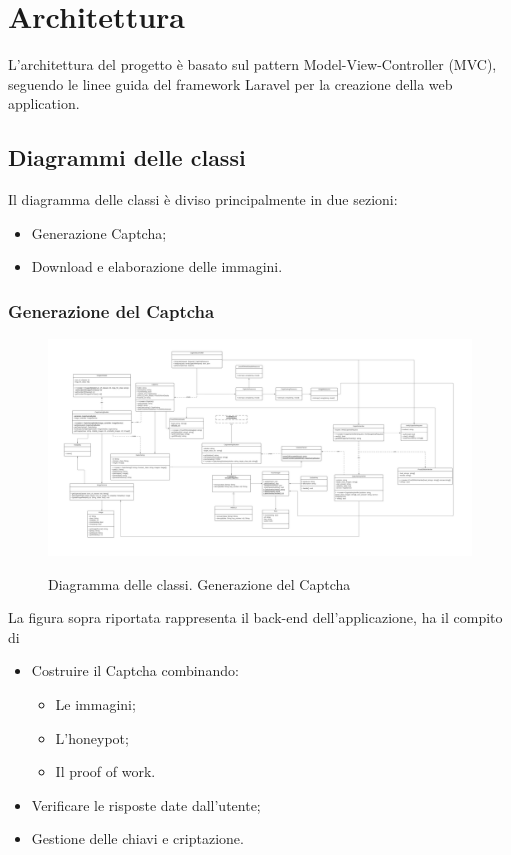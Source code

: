 \section{Architettura}
L'architettura del progetto è basato sul pattern Model-View-Controller (MVC), seguendo le linee guida del framework Laravel per la creazione della web application.


\subsection{Diagrammi delle classi}

Il diagramma delle classi è diviso principalmente in due sezioni:
\begin{itemize}
    \item Generazione Captcha;
    \item Download e elaborazione delle immagini.
\end{itemize}

\subsubsection{Generazione del Captcha}

\begin{landscape}
\begin{figure}[H]
    \centering
    \includegraphics[scale = 0.6]{img/generale.png}\\
    \caption{Diagramma delle classi. Generazione del Captcha}
\end{figure}
\end{landscape}
\newpage

La figura sopra riportata rappresenta il back-end dell'applicazione, ha il compito di
\begin{itemize}
    \item Costruire il Captcha combinando:
    \begin{itemize}
        \item Le immagini;
        \item L'honeypot;
        \item Il proof of work.
    \end{itemize}
    \item Verificare le risposte date dall'utente;
    \item Gestione delle chiavi e criptazione.
\end{itemize}

